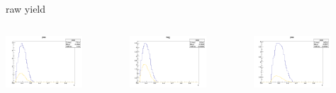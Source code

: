 \begin{frame}{raw yield}
\begin{columns}
\begin{column}[T]{0.25\textwidth}
\includegraphics[width = 0.7\textwidth]{results/yield/statistics/yield_x_Q2_z_0.65_5.500_0.40_pos.png}
\end{column}
\begin{column}[T]{0.25\textwidth}
\includegraphics[width = 0.7\textwidth]{results/yield/statistics/yield_x_Q2_z_0.65_5.500_0.40_neg.png}
\end{column}
\begin{column}[T]{0.25\textwidth}
\includegraphics[width = 0.7\textwidth]{results/yield/statistics/yield_x_Q2_z_0.65_5.500_0.50_pos.png}

\end{column}
\end{columns}
\end{frame}
